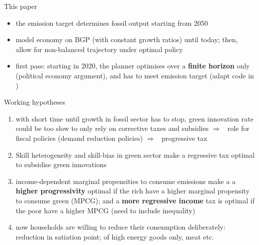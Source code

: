 \documentclass[11pt,aspectratio=169]{beamer}
\newcommand{\ar}{$\Rightarrow$ \ }
\begin{document}
\begin{frame}{This paper}
\begin{itemize}
	\item<+-> the emission target determines fossil output starting from 2050
	\vspace{3mm}
	\item<+-> model economy on BGP (with constant growth ratios) until today; then, allow for non-balanced trajectory under optimal policy
	\vspace{3mm}
	\item<+-> first pass: starting in 2020, the planner optimises over a \textbf{finite horizon} only (political economy argument), and has to meet emission target (adapt code in \cite{Barrage2019OptimalPolicy})
\end{itemize}
\end{frame}
\begin{frame}{Working hypotheses}	
	\begin{enumerate}
		\item<+-> with short time until growth in fossil sector has to stop, green innovation rate could be too slow to only rely on corrective taxes and subsidies \ar role for fiscal policies (demand reduction policies) \ar progressive tax
		\vspace{3mm}
		\item<+-> Skill heterogeneity and skill-bias in green sector make a regressive tax optimal to subsidise green innovations
		\vspace{3mm}
		\item<+-> income-dependent marginal propensities to consume emissions make a a \textbf{higher progressivity} optimal if the rich have a higher marginal propensity to consume green (MPCG); and a \textbf{more regressive income} tax is optimal if the poor have a higher MPCG (need to include inequality) 
		\vspace{3mm}
		\item<+-> now households are willing to reduce their consumption deliberately: reduction in satiation point; of high energy goods only, meat etc. 
	\end{enumerate}
\end{frame}
\end{document}
